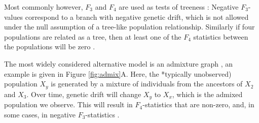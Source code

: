 \documentclass[12pt,fullpage, a4paper]{article}
\begin{document}

Most commonly however, $F_3$ and $F_4$ are used as tests of treeness \citep{patterson2012}: Negative $F_3$-values correspond to a branch with negative genetic drift, which is not allowed under the null assumption of a tree-like population relationship. Similarly if four populations are related as a tree, then at least one of the $F_4$ statistics between the populations will be zero \citep{buneman1974, patterson2012}. 

The most widely considered alternative model is an admixture graph \citep{patterson2012}, an example is given in Figure \ref{fig:admix}A. Here, the *typically unobserved) population $X_y$ is generated by a mixture of individuals from the ancestors of $X_2$ and $X_3$. Over time, genetic drift will change $X_y$ to $X_x$, which is the admixed population we observe. This will result in $F_4$-statistics that are non-zero, and, in some cases, in negative $F_3$-statistics \citep[exact conditions can be found in ][]{peter2016}. 
\end{document}
